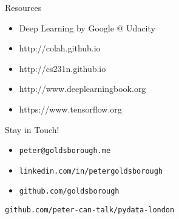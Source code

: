 

\begin{slide}{Resources}
  \begin{itemize}
      \item Deep Learning by Google @ Udacity
      \item http://colah.github.io
      \item http://cs231n.github.io
      \item http://www.deeplearningbook.org
      \item https://www.tensorflow.org
  \end{itemize}
\end{slide}

\begin{slide}{}
  {\huge Stay in Touch!}\\
  \vspace{1cm}
  \begin{itemize}
    \item \texttt{peter@goldsborough.me}
    \item \texttt{linkedin.com/in/petergoldsborough}
    \item \texttt{github.com/goldsborough}
  \end{itemize}

  \pause
  \vspace{1cm}
  \texttt{github.com/peter-can-talk/pydata-london}
\end{slide}

